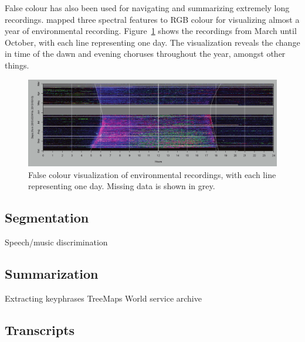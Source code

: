 
False colour has also been used for navigating and summarizing extremely long recordings. \citet{Towsey2014} mapped
three spectral features to RGB colour for visualizing almost a year of environmental recording.
Figure~\ref{fig:towsey} shows the recordings from March until October, with each line representing one day.  The
visualization reveals the change in time of the dawn and evening choruses throughout the year, amongst other things.

\begin{figure}[p]
  \centering
  \includegraphics[width=0.95\linewidth]{figs/towsey.png}
  \caption{False colour visualization of environmental recordings, with each line representing one day. Missing data is
    shown in grey.
    \citep{Towsey2014}}
  \label{fig:towsey}
\end{figure}

\subsection{Segmentation}

Speech/music discrimination \citep{Wieser2014}

\subsection{Summarization}

Extracting keyphrases \citep{Inkpen2004}
TreeMaps \citep{Abdulhamid2013a}
World service archive \citep{Raimond2014}

\subsection{Transcripts}\label{sec:background-transcripts}

